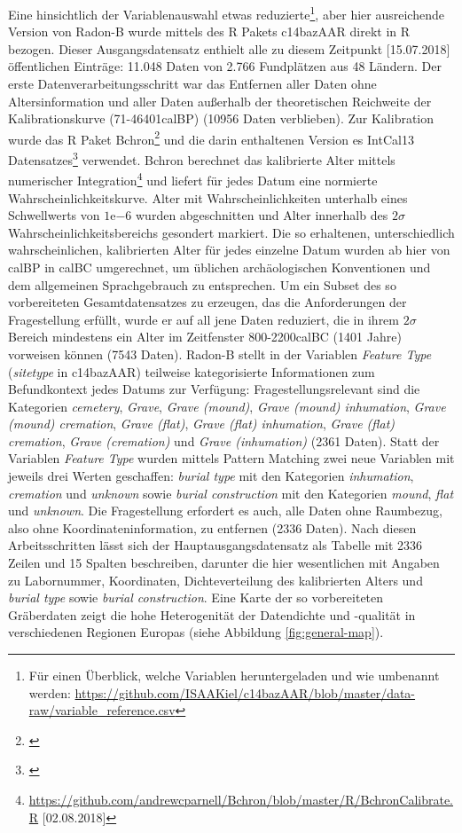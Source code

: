 \documentclass[openany,twoside,twocolumn]{book}
\let\rmarkdownfootnote\footnote%
\def\footnote{\protect\rmarkdownfootnote}
\begin{document}
Eine hinsichtlich der Variablenauswahl etwas reduzierte\footnote{Für
  einen Überblick, welche Variablen heruntergeladen und wie umbenannt
  werden:
  \url{https://github.com/ISAAKiel/c14bazAAR/blob/master/data-raw/variable_reference.csv}},
aber hier ausreichende Version von Radon-B wurde mittels des R Pakets
c14bazAAR direkt in R bezogen. Dieser Ausgangsdatensatz enthielt alle zu
diesem Zeitpunkt {[}15.07.2018{]} öffentlichen Einträge: 11.048 Daten
von 2.766 Fundplätzen aus 48 Ländern. Der erste
Datenverarbeitungsschritt war das Entfernen aller Daten ohne
Altersinformation und aller Daten außerhalb der theoretischen Reichweite
der Kalibrationskurve (71-46401calBP) (10956 Daten verblieben). Zur
Kalibration wurde das R Paket Bchron\footnote{\textcite{haslett_simple_2008}}
und die darin enthaltenen Version es IntCal13 Datensatzes\footnote{\textcite{reimer_intcal13_2013}}
verwendet. Bchron berechnet das kalibrierte Alter mittels numerischer
Integration\footnote{\url{https://github.com/andrewcparnell/Bchron/blob/master/R/BchronCalibrate.R}
  {[}02.08.2018{]}} und liefert für jedes Datum eine normierte
Wahrscheinlichkeitskurve. Alter mit Wahrscheinlichkeiten unterhalb eines
Schwellwerts von \(1\mathrm{e}{-6}\) wurden abgeschnitten und Alter
innerhalb des \(2\sigma\) Wahrscheinlichkeitsbereichs gesondert
markiert. Die so erhaltenen, unterschiedlich wahrscheinlichen,
kalibrierten Alter für jedes einzelne Datum wurden ab hier von calBP in
calBC umgerechnet, um üblichen archäologischen Konventionen und dem
allgemeinen Sprachgebrauch zu entsprechen. Um ein Subset des so
vorbereiteten Gesamtdatensatzes zu erzeugen, das die Anforderungen der
Fragestellung erfüllt, wurde er auf all jene Daten reduziert, die in
ihrem \(2\sigma\) Bereich mindestens ein Alter im Zeitfenster
800-2200calBC (1401 Jahre) vorweisen können (7543 Daten). Radon-B stellt
in der Variablen \emph{Feature Type} (\emph{sitetype} in c14bazAAR)
teilweise kategorisierte Informationen zum Befundkontext jedes Datums
zur Verfügung: Fragestellungsrelevant sind die Kategorien
\emph{cemetery}, \emph{Grave}, \emph{Grave (mound)}, \emph{Grave (mound)
inhumation}, \emph{Grave (mound) cremation}, \emph{Grave (flat)},
\emph{Grave (flat) inhumation}, \emph{Grave (flat) cremation},
\emph{Grave (cremation)} und \emph{Grave (inhumation)} (2361 Daten).
Statt der Variablen \emph{Feature Type} wurden mittels Pattern Matching
zwei neue Variablen mit jeweils drei Werten geschaffen: \emph{burial
type} mit den Kategorien \emph{inhumation}, \emph{cremation} und
\emph{unknown} sowie \emph{burial construction} mit den Kategorien
\emph{mound}, \emph{flat} und \emph{unknown}. Die Fragestellung
erfordert es auch, alle Daten ohne Raumbezug, also ohne
Koordinateninformation, zu entfernen (2336 Daten). Nach diesen
Arbeitsschritten lässt sich der Hauptausgangsdatensatz als Tabelle mit
2336 Zeilen und 15 Spalten beschreiben, darunter die hier wesentlichen
mit Angaben zu Labornummer, Koordinaten, Dichteverteilung des
kalibrierten Alters und \emph{burial type} sowie \emph{burial
construction}. Eine Karte der so vorbereiteten Gräberdaten zeigt die
hohe Heterogenität der Datendichte und -qualität in verschiedenen
Regionen Europas (siehe Abbildung \ref{fig:general-map}).
\end{document}
